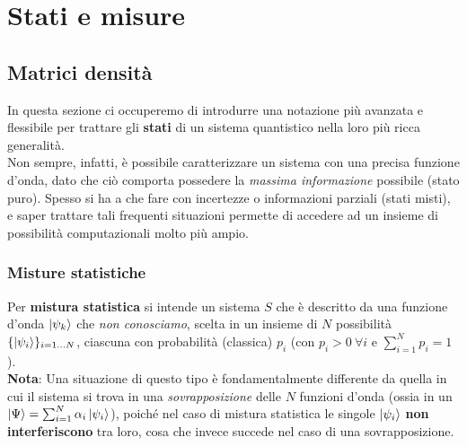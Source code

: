 \documentclass[../../InformazioneQuantistica.tex]{subfiles}
\begin{document}


\chapter{Stati e misure}
\section{Matrici densità}
In questa sezione ci occuperemo di introdurre una notazione più avanzata e flessibile per trattare gli \textbf{stati} di un sistema quantistico nella loro più ricca generalità.\\
Non sempre, infatti, è possibile caratterizzare un sistema con una precisa funzione d'onda, dato che ciò comporta possedere la \textit{massima informazione} possibile (stato puro). Spesso si ha a che fare con incertezze o informazioni parziali (stati misti), e saper trattare tali frequenti situazioni permette di accedere ad un insieme di possibilità computazionali molto più ampio.

\subsection{Misture statistiche}
Per \textbf{mistura statistica} si intende un sistema $S$ che è descritto da una funzione d'onda $\Ket{\psi_k}$ che \textit{non conosciamo}, scelta in un insieme di $N$ possibilità $\{\Ket{\psi_i}\}_{i=1\dots N}$, ciascuna con probabilità (classica) $p_i$ (con $p_i > 0 \> \forall i$ e $\sum_{i=1}^N p_i = 1$).\\

\textbf{Nota}: Una situazione di questo tipo è fondamentalmente differente da quella in cui il sistema si trova in una \textit{sovrapposizione} delle $N$ funzioni d'onda (ossia in un $\Ket{\Psi} = \sum_{i=1}^N \alpha_i \Ket{\psi_i}$), poiché nel caso di mistura statistica le singole $\Ket{\psi_i}$ \textbf{non interferiscono} tra loro, cosa che invece succede nel caso di una sovrapposizione.\\
\end{document}
